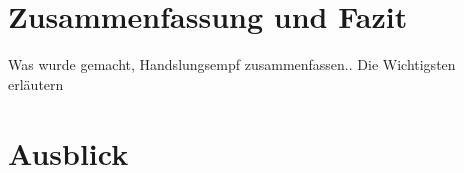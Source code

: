 \documentclass{sigchi}
\begin{document}
\section{Zusammenfassung und Fazit}
Was wurde gemacht, Handslungsempf zusammenfassen..
Die Wichtigsten erläutern
\section{Ausblick}

%
%
\end{document}
